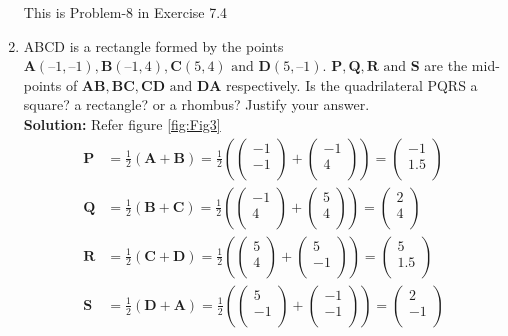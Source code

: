 \documentclass[12pt]{article}
\providecommand{\brak}[1]{\ensuremath{\left(#1\right)}}
\newcommand{\solution}{\noindent \textbf{Solution: }}
\newcommand{\myvec}[1]{\ensuremath{\begin{pmatrix}#1\end{pmatrix}}}
\let\vec\mathbf
\begin{document}
\begin{enumerate}
This is Problem-8 in Exercise 7.4
\item ABCD is a rectangle formed by the points $\vec{A}(–1, –1), \vec{B}(– 1, 4), \vec{ C}(5, 4) \text{ and } \vec{D}(5, – 1)$. $\vec{P,Q,R} \text{ and } \vec{S}$ are the mid-points of $\vec{AB, BC, CD} \text{ and } \vec{DA}$ respectively. Is the quadrilateral
PQRS a square? a rectangle? or a rhombus? Justify your answer. \\
\solution 
Refer figure \ref{fig:Fig3}
\begin{align}
  \label{eq:det2f}
  \vec{P} &= \frac{1}{2}\brak{\vec{A}+\vec{B}} =   \frac{1}{2}\brak{\myvec{
  -1 \\
  -1 \\
 } + \myvec{
  -1 \\
  4 \\
 } 
 } = \myvec{
 -1 \\
 1.5 \\
 }   \\
 \vec{Q} &= \frac{1}{2}\brak{\vec{B}+\vec{C}} =   \frac{1}{2}\brak{\myvec{
  -1 \\
  4 \\
 } + \myvec{
  5 \\
  4 \\
 } 
 } = \myvec{
 2 \\
 4 \\
 }   \\
 \vec{R} &= \frac{1}{2}\brak{\vec{C}+\vec{D}} =   \frac{1}{2}\brak{\myvec{
  5 \\
  4 \\
 } + \myvec{
  5 \\
  -1\\
 } 
 } = \myvec{
 5 \\
 1.5 \\
 }   \\
 \vec{S} &= \frac{1}{2}\brak{\vec{D}+\vec{A}} =   \frac{1}{2}\brak{\myvec{
  5 \\
  -1 \\
 } + \myvec{
  -1 \\
  -1\\
 } 
 } = \myvec{
 2\\
 -1 \\
 }   \\
\end{align}


\end{enumerate}
\end{document}
